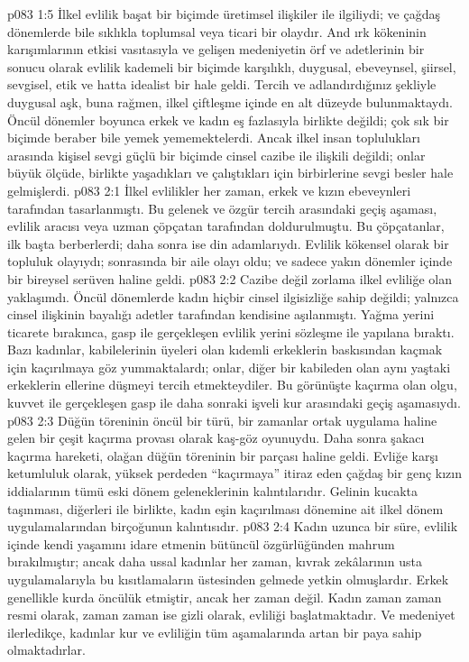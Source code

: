 \vs p083 1:5 İlkel evlilik başat bir biçimde üretimsel ilişkiler ile ilgiliydi; ve çağdaş dönemlerde bile sıklıkla toplumsal veya ticari bir olaydır. And ırk kökeninin karışımlarının etkisi vasıtasıyla ve gelişen medeniyetin örf ve adetlerinin bir sonucu olarak evlilik kademeli bir biçimde karşılıklı, duygusal, ebeveynsel, şiirsel, sevgisel, etik ve hatta idealist bir hale geldi. Tercih ve adlandırdığınız şekliyle duygusal aşk, buna rağmen, ilkel çiftleşme içinde en alt düzeyde bulunmaktaydı. Öncül dönemler boyunca erkek ve kadın eş fazlasıyla birlikte değildi; çok sık bir biçimde beraber bile yemek yememektelerdi. Ancak ilkel insan toplulukları arasında kişisel sevgi güçlü bir biçimde cinsel cazibe ile ilişkili değildi; onlar büyük ölçüde, birlikte yaşadıkları ve çalıştıkları için birbirlerine sevgi besler hale gelmişlerdi.
\vs p083 2:1 İlkel evlilikler her zaman, erkek ve kızın ebeveynleri tarafından tasarlanmıştı. Bu gelenek ve özgür tercih arasındaki geçiş aşaması, evlilik aracısı veya uzman çöpçatan tarafından doldurulmuştu. Bu çöpçatanlar, ilk başta berberlerdi; daha sonra ise din adamlarıydı. Evlilik kökensel olarak bir topluluk olayıydı; sonrasında bir aile olayı oldu; ve sadece yakın dönemler içinde bir bireysel serüven haline geldi.
\vs p083 2:2 Cazibe değil zorlama ilkel evliliğe olan yaklaşımdı. Öncül dönemlerde kadın hiçbir cinsel ilgisizliğe sahip değildi; yalnızca cinsel ilişkinin bayalığı adetler tarafından kendisine aşılanmıştı. Yağma yerini ticarete bırakınca, gasp ile gerçekleşen evlilik yerini sözleşme ile yapılana bıraktı. Bazı kadınlar, kabilelerinin üyeleri olan kıdemli erkeklerin baskısından kaçmak için kaçırılmaya göz yummaktalardı; onlar, diğer bir kabileden olan aynı yaştaki erkeklerin ellerine düşmeyi tercih etmekteydiler. Bu görünüşte kaçırma olan olgu, kuvvet ile gerçekleşen gasp ile daha sonraki işveli kur arasındaki geçiş aşamasıydı.
\vs p083 2:3 Düğün töreninin öncül bir türü, bir zamanlar ortak uygulama haline gelen bir çeşit kaçırma provası olarak kaş\hyp{}göz oyunuydu. Daha sonra şakacı kaçırma hareketi, olağan düğün töreninin bir parçası haline geldi. Evliğe karşı ketumluluk olarak, yüksek perdeden “kaçırmaya” itiraz eden çağdaş bir genç kızın iddialarının tümü eski dönem geleneklerinin kalıntılarıdır. Gelinin kucakta taşınması, diğerleri ile birlikte, kadın eşin kaçırılması dönemine ait ilkel dönem uygulamalarından birçoğunun kalıntısıdır.
\vs p083 2:4 Kadın uzunca bir süre, evlilik içinde kendi yaşamını idare etmenin bütüncül özgürlüğünden mahrum bırakılmıştır; ancak daha ussal kadınlar her zaman, kıvrak zekâlarının usta uygulamalarıyla bu kısıtlamaların üstesinden gelmede yetkin olmuşlardır. Erkek genellikle kurda öncülük etmiştir, ancak her zaman değil. Kadın zaman zaman resmi olarak, zaman zaman ise gizli olarak, evliliği başlatmaktadır. Ve medeniyet ilerledikçe, kadınlar kur ve evliliğin tüm aşamalarında artan bir paya sahip olmaktadırlar.
